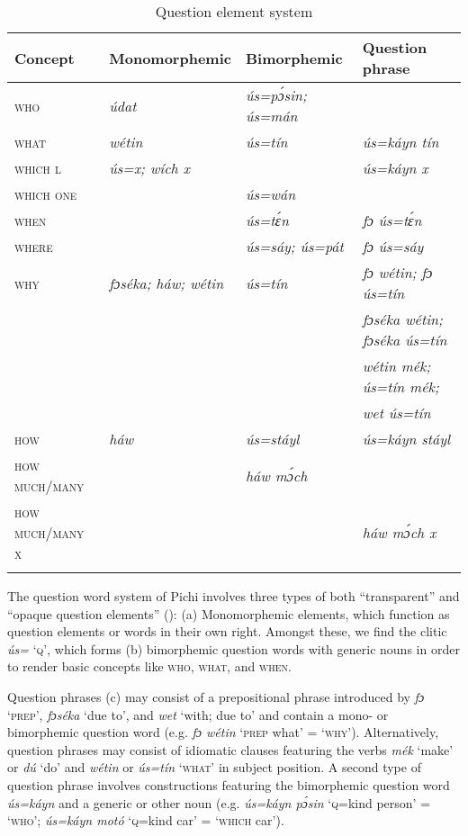 \begin{table}
\caption{Question element system}
\label{tab:key:7.4}

\begin{tabularx}{\textwidth}{lXXX}
\lsptoprule

Concept & Monomorphemic & Bimorphemic & Question phrase\\
\midrule
\textsc{who} & \itshape údat & \itshape ús=pɔ́sin; ús=mán & \\
\textsc{what} & \itshape wétin & \itshape ús=tín & \itshape ús=káyn tín \\
\textsc{which} \textsc{l} & \itshape ús=x; wích x &  & \itshape ús=káyn x\\
\textsc{which} \textsc{one} &  & \itshape ús=wán & \\
\textsc{when} &  & \itshape ús=tɛ́n & \itshape fɔ ús=tɛ́n\\
\textsc{where} &  & \itshape ús=sáy; ús=pát & \itshape fɔ ús=sáy\\
\textsc{why} & \itshape fɔséka; háw; wétin & \itshape ús=tín & \itshape fɔ wétin; fɔ ús=tín \\
&  &  & \itshape fɔséka wétin; fɔséka ús=tín \\
&  &  & \itshape wétin mék; ús=tín mék; \\
&  &  & \itshape wet ús=tín \\
\textsc{how} & \itshape háw & \itshape ús=stáyl & \itshape ús=káyn stáyl \\
\textsc{how} \textsc{much/many} &  & \itshape háw mɔ́ch & \\
\textsc{how} \textsc{much/many} \textsc{x} &  &  & \itshape háw mɔ́ch x\\
\lspbottomrule
\end{tabularx}
\end{table}
The question word system of Pichi involves three types of both “transparent” and “opaque question elements” (\citealt{MuyskenSmith1990}): (a) Monomorphemic elements, which function as question elements or words in their own right. Amongst these, we find the clitic \textit{ús=} ‘\textsc{q}’, which forms (b) bimorphemic question words with generic nouns in order to render basic concepts like \textsc{who,} \textsc{what,} and \textsc{when.} 


Question phrases (c) may consist of a prepositional phrase introduced by \textit{fɔ} ‘\textsc{prep}’, \textit{fɔséka} ‘due to’, and \textit{wet} ‘with; due to’ and contain a mono- or bimorphemic question word (e.g. \textit{fɔ wétin} ‘\textsc{prep} what’ = ‘\textsc{why’}). Alternatively, question phrases may consist of idiomatic clauses featuring the verbs \textit{mék} ‘make’ or \textit{dú} ‘do’ and \textit{wétin} or \textit{ús=tín} ‘\textsc{what’} in subject position. A second type of question phrase involves constructions featuring the bimorphemic question word \textit{ús=káyn} and a generic or other noun (e.g. \textit{ús=káyn pɔ́sin} ‘\textsc{q}=kind person’ = ‘\textsc{who’}; \textit{ús=káyn motó} ‘\textsc{q}=kind car’ = ‘\textsc{which} car’). 



